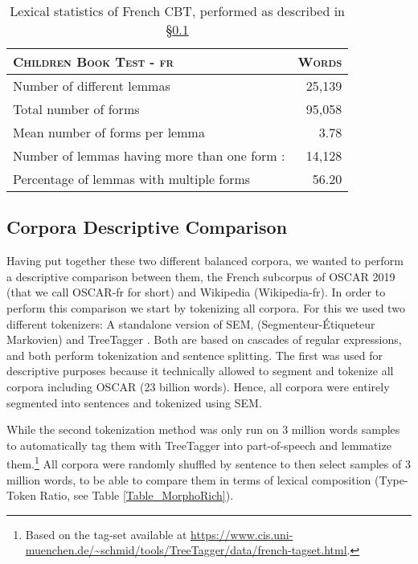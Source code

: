 \begin{table}[ht]
    \centering\small
    \begin{tabular}{lr}                                                             \\\toprule
        {\textsc{Children Book Test - fr}}           & { \textsc{Words}} \\\midrule
        Number of different lemmas                   & 25,139            \\
        Total number of forms                        & 95,058            \\
        Mean number of forms per lemma               & 3.78              \\
        Number of lemmas having more than one form : & 14,128            \\
        Percentage of lemmas with multiple forms     & 56.20             \\
        \bottomrule
    \end{tabular}
    \caption{\label{Table_DescribeCBTfr} Lexical statistics of French CBT, performed as described in §\ref{sec:CompareCorpora}}
\end{table}

\subsection{Corpora Descriptive Comparison} \label{sec:CompareCorpora}

Having put together these two different balanced corpora, we wanted to perform a descriptive comparison between them, the French subcorpus of OSCAR 2019 (that we call OSCAR-fr for short) and Wikipedia (Wikipedia-fr). In order to perform this comparison we start by tokenizing all corpora. For this we used two different tokenizers: A standalone version of SEM, (Segmenteur-Étiqueteur Markovien) \citep{dupont-2017-exploration} and TreeTagger \citep{schmid-1999-improvements}. Both are based on cascades of regular expressions, and both perform tokenization and sentence splitting. The first was used for descriptive purposes because it technically allowed to segment and tokenize all corpora including OSCAR (23 billion words). Hence, all corpora were entirely segmented into sentences and tokenized using SEM.

While the second tokenization method was only run on 3 million words samples to automatically tag them with TreeTagger into part-of-speech and lemmatize them.\footnote{Based on the tag-set available at \url{https://www.cis.uni-muenchen.de/~schmid/tools/TreeTagger/data/french-tagset.html}.} All corpora were randomly shuffled by sentence to then select samples of 3 million words, to be able to compare them in terms of lexical composition (Type-Token Ratio, see Table \ref{Table_MorphoRich}).

